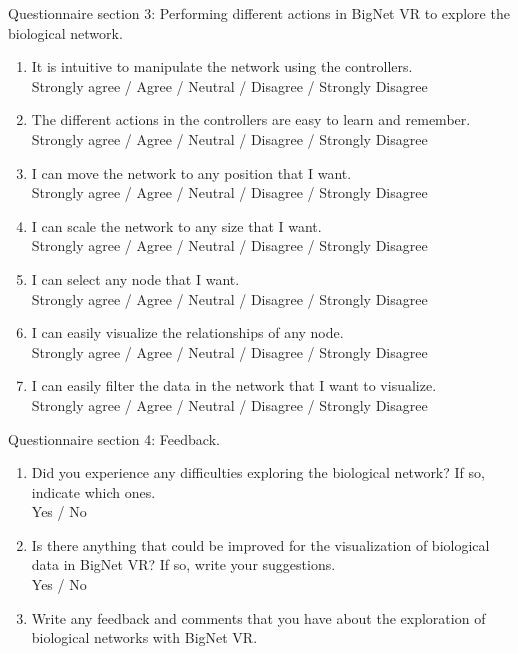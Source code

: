 Questionnaire section 3: Performing different actions in BigNet VR to explore the biological network.
\begin{enumerate}
  \item It is intuitive to manipulate the network using the controllers.\\
  Strongly agree / Agree / Neutral / Disagree / Strongly Disagree

  \item The different actions in the controllers are easy to learn and remember.\\
  Strongly agree / Agree / Neutral / Disagree / Strongly Disagree

  \item I can move the network to any position that I want.\\
  Strongly agree / Agree / Neutral / Disagree / Strongly Disagree

  \item I can scale the network to any size that I want.\\
  Strongly agree / Agree / Neutral / Disagree / Strongly Disagree

  \item I can select any node that I want.\\
  Strongly agree / Agree / Neutral / Disagree / Strongly Disagree

  \item I can easily visualize the relationships of any node.\\
  Strongly agree / Agree / Neutral / Disagree / Strongly Disagree

  \item I can easily filter the data in the network that I want to visualize.\\
  Strongly agree / Agree / Neutral / Disagree / Strongly Disagree\\
\end{enumerate}

Questionnaire section 4: Feedback.
\begin{enumerate}
  \item Did you experience any difficulties exploring the biological network? If so, indicate which ones.\\
  Yes / No

  \item Is there anything that could be improved for the visualization of biological data in BigNet VR? If so, write your suggestions.\\
  Yes / No

  \item Write any feedback and comments that you have about the exploration of biological networks with BigNet VR.
\end{enumerate}
